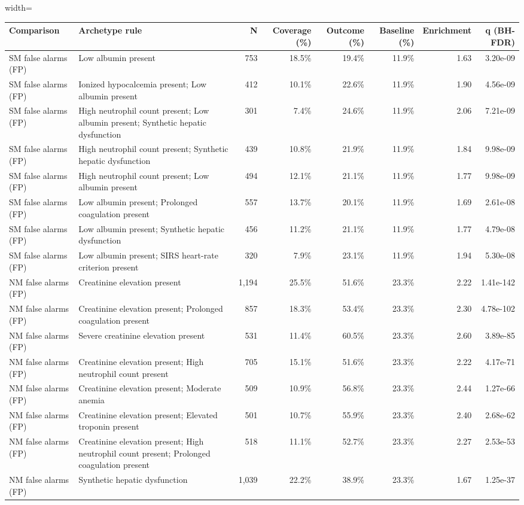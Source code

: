 \documentclass[border=0pt]{standalone}
\begin{document}
\begin{adjustbox}{width=\textwidth}
\begin{tabular}{@{}llrrrrrr@{}}
\toprule
Comparison & Archetype rule & N & Coverage (\%) & Outcome (\%) & Baseline (\%) & Enrichment & q (BH-FDR) \\
\midrule
SM false alarms (FP) & Low albumin present & 753 & 18.5\% & 19.4\% & 11.9\% & 1.63 & 3.20e-09 \\
SM false alarms (FP) & Ionized hypocalcemia present; Low albumin present & 412 & 10.1\% & 22.6\% & 11.9\% & 1.90 & 4.56e-09 \\
SM false alarms (FP) & High neutrophil count present; Low albumin present; Synthetic hepatic dysfunction & 301 & 7.4\% & 24.6\% & 11.9\% & 2.06 & 7.21e-09 \\
SM false alarms (FP) & High neutrophil count present; Synthetic hepatic dysfunction & 439 & 10.8\% & 21.9\% & 11.9\% & 1.84 & 9.98e-09 \\
SM false alarms (FP) & High neutrophil count present; Low albumin present & 494 & 12.1\% & 21.1\% & 11.9\% & 1.77 & 9.98e-09 \\
SM false alarms (FP) & Low albumin present; Prolonged coagulation present & 557 & 13.7\% & 20.1\% & 11.9\% & 1.69 & 2.61e-08 \\
SM false alarms (FP) & Low albumin present; Synthetic hepatic dysfunction & 456 & 11.2\% & 21.1\% & 11.9\% & 1.77 & 4.79e-08 \\
SM false alarms (FP) & Low albumin present; SIRS heart-rate criterion present & 320 & 7.9\% & 23.1\% & 11.9\% & 1.94 & 5.30e-08 \\
NM false alarms (FP) & Creatinine elevation present & 1,194 & 25.5\% & 51.6\% & 23.3\% & 2.22 & 1.41e-142 \\
NM false alarms (FP) & Creatinine elevation present; Prolonged coagulation present & 857 & 18.3\% & 53.4\% & 23.3\% & 2.30 & 4.78e-102 \\
NM false alarms (FP) & Severe creatinine elevation present & 531 & 11.4\% & 60.5\% & 23.3\% & 2.60 & 3.89e-85 \\
NM false alarms (FP) & Creatinine elevation present; High neutrophil count present & 705 & 15.1\% & 51.6\% & 23.3\% & 2.22 & 4.17e-71 \\
NM false alarms (FP) & Creatinine elevation present; Moderate anemia & 509 & 10.9\% & 56.8\% & 23.3\% & 2.44 & 1.27e-66 \\
NM false alarms (FP) & Creatinine elevation present; Elevated troponin present & 501 & 10.7\% & 55.9\% & 23.3\% & 2.40 & 2.68e-62 \\
NM false alarms (FP) & Creatinine elevation present; High neutrophil count present; Prolonged coagulation present & 518 & 11.1\% & 52.7\% & 23.3\% & 2.27 & 2.53e-53 \\
NM false alarms (FP) & Synthetic hepatic dysfunction & 1,039 & 22.2\% & 38.9\% & 23.3\% & 1.67 & 1.25e-37 \\
\bottomrule
\end{tabular}
\end{adjustbox}
\end{document}
